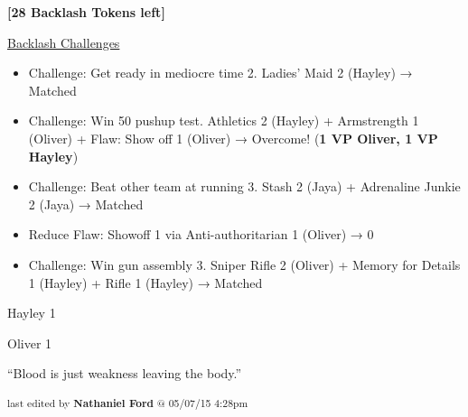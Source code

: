 \textbf{{[}28 Backlash Tokens left{]}}



\underline{  {\LARGE Backlash Challenges }  }



\begin{itemize}
\item Challenge: Get ready in mediocre time 2.  Ladies' Maid 2 (Hayley) → Matched
\item Challenge: Win 50 pushup test. Athletics 2 (Hayley) + Armstrength 1 (Oliver) +  {\color[RGB]{255,0,0}Flaw: Show off 1}  (Oliver) → Overcome! (\textbf{1 VP Oliver, 1 VP Hayley})
\item Challenge: Beat other team at running 3.  Stash 2 (Jaya) + Adrenaline Junkie 2 (Jaya) → Matched
\item Reduce Flaw: Showoff 1 via Anti-authoritarian 1 (Oliver) → 0
\item Challenge: Win gun assembly 3. Sniper Rifle 2 (Oliver) + Memory for Details 1 (Hayley) + Rifle 1 (Hayley)  → Matched
\end{itemize}



Hayley 1

Oliver 1



``Blood is just weakness leaving the body.''

\vspace{\fill}


\begin{flushright}
\textsubscript{last edited by \textbf{Nathaniel Ford} @ 05/07/15 4:28pm}
\end{flushright}

